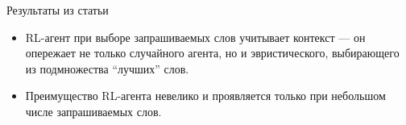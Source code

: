 \documentclass{beamer}
\begin{document}
\begin{frame}{Результаты из статьи}
    \begin{figure}[htb]
    \end{figure}

    \begin{itemize}
        \item <1->  RL-агент при выборе запрашиваемых слов учитывает контекст ---
        он опережает не только случайного агента, но и эвристического,
        выбирающего из подмножества ``лучших'' слов.
        \item <2-> Преимущество RL-агента невелико и проявляется только при
        небольшом числе запрашиваемых слов.
    \end{itemize}
\end{frame}
\end{document}

